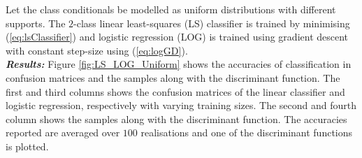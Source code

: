 \documentclass[12pt, a4 paper]{article}
\begin{document}

\label{prob:1.b}

Let the class conditionals be modelled as uniform distributions with different supports. The $2$-class linear least-squares (LS) classifier is trained by minimising (\ref{eq:lsClassifier}) and logistic regression (LOG) is trained using gradient descent with constant step-size using (\ref{eq:logGD}). \\

{\it \bfseries Results:} Figure \ref{fig:LS_LOG_Uniform} shows the accuracies of classification in confusion matrices and the samples along with the discriminant function. The first and third columns shows the confusion matrices of the linear classifier and logistic regression, respectively with varying training sizes. The second and fourth column shows the samples along with the discriminant function. The accuracies reported are averaged over $100$ realisations and one of the discriminant functions is plotted. \\
\end{document}
